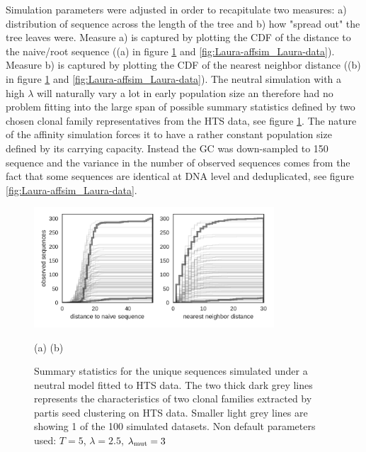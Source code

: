 Simulation parameters were adjusted in order to recapitulate two measures: a) distribution of sequence across the length of the tree and b) how "spread out" the tree leaves were.
Measure a) is captured by plotting the CDF of the distance to the naive/root sequence ((a) in figure \ref{fig:Laura-neutsim_Laura-data} and \ref{fig:Laura-affsim_Laura-data}).
Measure b) is captured by plotting the CDF of the nearest neighbor distance ((b) in figure \ref{fig:Laura-neutsim_Laura-data} and \ref{fig:Laura-affsim_Laura-data}).
The neutral simulation with a high $\lambda$ will naturally vary a lot in early population size an therefore had no problem fitting into the large span of possible summary statistics defined by two chosen clonal family representatives from the HTS data, see figure \ref{fig:Laura-neutsim_Laura-data}.
The nature of the affinity simulation forces it to have a rather constant population size defined by its carrying capacity.
Instead the GC was down-sampled to 150 sequence and the variance in the number of observed sequences comes from the fact that some sequences are identical at DNA level and deduplicated, see figure \ref{fig:Laura-affsim_Laura-data}.

\begin{figure}[!ht]
    \begin{center}
    \includegraphics[width=0.8\textwidth]{figures/Laura-neutsim_Laura-data.pdf}\newline%
    \end{center}
    \vspace{-14mm} \hspace{44mm} (a) \hspace{50mm} (b)
    \caption{
        \label{fig:Laura-neutsim_Laura-data}
        Summary statistics for the unique sequences simulated under a neutral model fitted to HTS data.
        The two thick dark grey lines represents the characteristics of two clonal families extracted by partis seed clustering on HTS data.
        Smaller light grey lines are showing 1 of the 100 simulated datasets.
        Non default parameters used: $T=5$, $\lambda=2.5$, $\lambda_{\text{mut}}=3$
    }
\end{figure}

